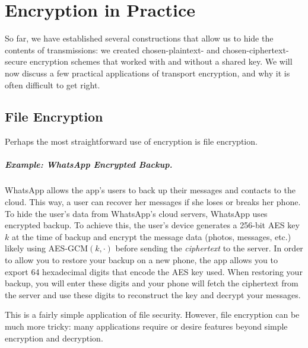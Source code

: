 \chapter{Encryption in Practice}

So far, we have established several constructions
that allow us to hide the contents of
transmissions: we created chosen-plaintext- 
and chosen-ciphertext-secure
encryption schemes that worked with and without
a shared key.
We will now discuss a few practical applications
of transport encryption, and why it is often difficult
to get right.


\section{File Encryption}
Perhaps the most straightforward use of encryption is file encryption.

\paragraph{Example: WhatsApp Encrypted Backup.}
WhatsApp allows the app's users to back up their 
messages and contacts to the cloud.
This way, a user can recover her messages 
if she loses or breaks her phone.
To hide the user's data from WhatsApp's cloud servers, WhatsApp
uses encrypted backup.
To achieve this, the user's device generates
a 256-bit AES key $k$ at the time of backup
and encrypt the message data
(photos, messages, etc.) likely using AES-GCM$(k, \cdot)$
before sending the \emph{ciphertext} to the
server. In order to allow you to restore your
backup on a new phone, the app allows you to
export 64 hexadecimal digits that encode the AES key
used. When restoring your backup, you will enter
these digits and your phone will fetch the
ciphertext from the server and use these digits to
reconstruct the key and decrypt your messages.

This is a fairly simple application of file security. However, file encryption can be much more tricky: many applications require or desire features beyond simple encryption and decryption.

